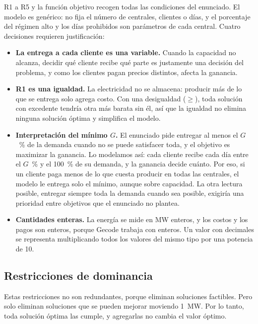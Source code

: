 R1 a R5 y la función objetivo recogen todas las condiciones del enunciado. El modelo es genérico: no fija el número de centrales, clientes o días, y el porcentaje del régimen alto y los días prohibidos son parámetros de cada central. Cuatro decisiones requieren justificación:

\begin{itemize}
    \item \textbf{La entrega a cada cliente es una variable.} Cuando la capacidad no alcanza, decidir qué cliente recibe qué parte es justamente una decisión del problema, y como los clientes pagan precios distintos, afecta la ganancia.
    \item \textbf{R1 es una igualdad.} La electricidad no se almacena: producir más de lo que se entrega solo agrega costo. Con una desigualdad ($\ge$), toda solución con excedente tendría otra más barata sin él, así que la igualdad no elimina ninguna solución óptima y simplifica el modelo.
    \item \textbf{Interpretación del mínimo $G$.} El enunciado pide entregar al menos el $G$~\% de la demanda cuando no se puede satisfacer toda, y el objetivo es maximizar la ganancia. Lo modelamos así: cada cliente recibe cada día entre el $G$~\% y el 100~\% de su demanda, y la ganancia decide cuánto. Por eso, si un cliente paga menos de lo que cuesta producir en todas las centrales, el modelo le entrega solo el mínimo, aunque sobre capacidad. La otra lectura posible, entregar siempre toda la demanda cuando sea posible, exigiría una prioridad entre objetivos que el enunciado no plantea.
    \item \textbf{Cantidades enteras.} La energía se mide en MW enteros, y los costos y los pagos son enteros, porque Gecode trabaja con enteros. Un valor con decimales se representa multiplicando todos los valores del mismo tipo por una potencia de 10.
\end{itemize}


\subsection{Restricciones de dominancia}

Estas restricciones no son redundantes, porque eliminan soluciones factibles. Pero solo eliminan soluciones que se pueden mejorar moviendo 1~MW. Por lo tanto, toda solución óptima las cumple, y agregarlas no cambia el valor óptimo.

